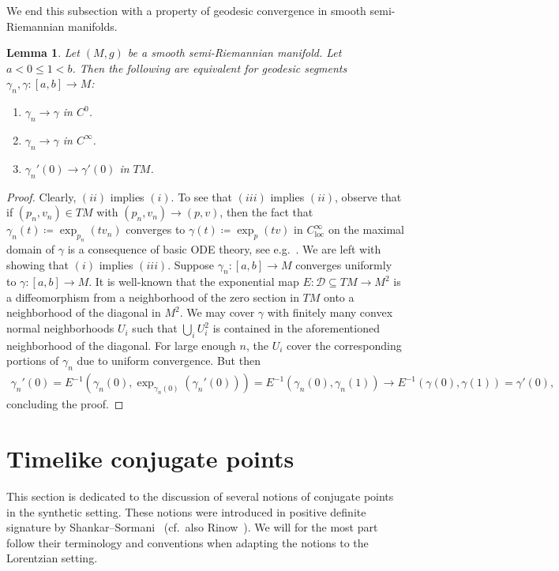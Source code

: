 \documentclass[a4paper,11pt]{article}
\numberwithin{equation}{section}
\theoremstyle{plain}
\newtheorem{Lemma}[Definition]{Lemma}
\theoremstyle{definition}
\begin{document}
We end this subsection with a property of geodesic convergence in smooth semi-Riemannian manifolds. 
\begin{Lemma}\label{lem:geod_convergence}
Let $(M,g)$ be a smooth semi-Riemannian manifold. Let $a < 0 \leq 1 < b$. Then the following are equivalent for geodesic segments $\gamma_n, \gamma \colon [a,b] \to M$:
\begin{enumerate}
    \item $\gamma_n \to \gamma$ in $C^0$.
    \item $\gamma_n \to \gamma$ in $C^\infty$.
    \item $\gamma_n'(0) \to \gamma'(0)$ in $TM$.
\end{enumerate}
\end{Lemma}
\begin{proof}
Clearly, $(ii)$ implies $(i)$. To see that $(iii)$ implies $(ii)$, observe that if $(p_n,v_n) \in TM$ with $(p_n,v_n) \to (p,v)$, then the fact that $\gamma_n(t) \coloneqq \exp_{p_n}(t v_n)$ converges to $\gamma(t) \coloneqq \exp_{p}(tv)$ in $C^\infty_{\mathrm{loc}}$ on the maximal domain of $\gamma$ is a consequence of basic ODE theory, see e.g.\ \cite[Cor.\ 2.6]{KOSS}. We are left with showing that $(i)$ implies $(iii)$. Suppose $\gamma_n \colon [a,b] \to M$ converges uniformly to $\gamma \colon [a,b] \to M$. It is well-known that the exponential map $E \colon \mathcal{D} \subseteq TM \to M^2$ is a diffeomorphism from a neighborhood of the zero section in $TM$ onto a neighborhood of the diagonal in $M^2$. We may cover $\gamma$ with finitely many convex normal neighborhoods $U_i$ such that $\bigcup_i U_i^2$ is contained in the aforementioned neighborhood of the diagonal. For large enough $n$, the $U_i$ cover the corresponding portions of $\gamma_n$ due to uniform convergence. But then
    \begin{align*}
        \gamma_n'(0) = E^{-1}(\gamma_n(0),\exp_{\gamma_n(0)}(\gamma_n'(0))) = E^{-1}(\gamma_n(0),\gamma_n(1)) \to E^{-1}(\gamma(0),\gamma(1)) = \gamma'(0),
    \end{align*}
    concluding the proof.
\end{proof}


\section{Timelike conjugate points}
\label{Section: Timelikeconjugatepoints}

This section is dedicated to the discussion of several notions of conjugate points in the synthetic setting. These notions were introduced in positive definite signature by Shankar--Sormani~\cite{shankar2009conjugate} (cf.\ also Rinow~\cite{rinow1961innere}). We will for the most part follow their terminology and conventions when adapting the notions to the Lorentzian setting.
\end{document}
